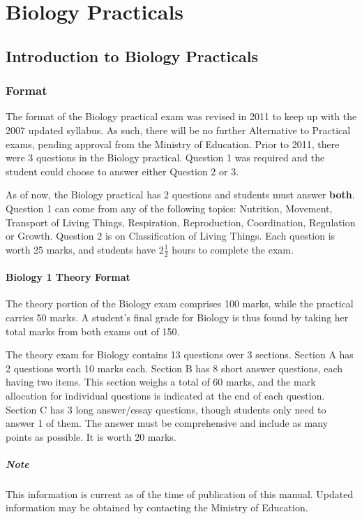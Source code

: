 \chapter{Biology Practicals}

\section{Introduction to Biology Practicals}

\subsection{Format}
The format of the Biology practical exam was revised in 2011 to keep up with the 2007 updated syllabus. As such, there will be no further Alternative to Practical exams, pending approval from the Ministry of Education. Prior to 2011, there were 3 questions in the Biology practical. Question 1 was required and the student could choose to answer either Question 2 or 3.

As of now, the Biology practical has 2 questions and students must answer \textbf{both}. Question 1 can come from any of the following topics: Nutrition, Movement, Transport of Living Things, Respiration, Reproduction, Coordination, Regulation or Growth. Question 2 is on Classification of Living Things. Each question is worth 25 marks, and students have 2$\frac{1}{2}$ hours to complete the exam.

\subsubsection{Biology 1 Theory Format}
The theory portion of the Biology exam comprises 100 marks, while the practical carries 50 marks. A student's final grade for Biology is thus found by taking her total marks from both exams out of 150.

The theory exam for Biology contains 13 questions over 3 sections. Section A has 2 questions worth 10 marks each.  Section B has 8 short answer questions, each having two items. This section weighs a total of 60 marks, and the mark allocation for individual questions is indicated at the end of each question. Section C has 3 long answer\slash essay questions, though students only need to answer 1 of them. The answer must be comprehensive and include as many points as possible. It is worth 20 marks.

\paragraph{Note} This information is current as of the time of publication of this manual. Updated information may be obtained by contacting the Ministry of Education. 

